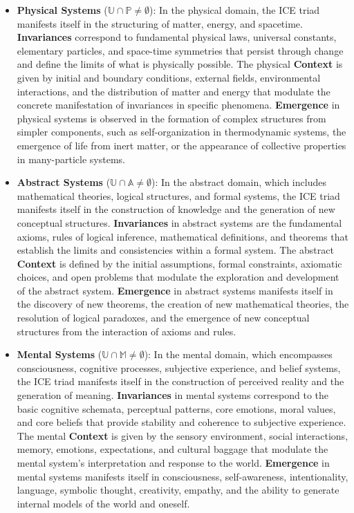 \documentclass{article}
\begin{document}
\begin{itemize}
\item \textbf{Physical Systems} ($\mathbb{U} \cap \mathbb{P} \neq \emptyset$): In the physical domain, the ICE triad manifests itself in the structuring of matter, energy, and spacetime. \textbf{Invariances} correspond to fundamental physical laws, universal constants, elementary particles, and space-time symmetries that persist through change and define the limits of what is physically possible. The physical \textbf{Context} is given by initial and boundary conditions, external fields, environmental interactions, and the distribution of matter and energy that modulate the concrete manifestation of invariances in specific phenomena. \textbf{Emergence} in physical systems is observed in the formation of complex structures from simpler components, such as self-organization in thermodynamic systems, the emergence of life from inert matter, or the appearance of collective properties in many-particle systems.

   \item \textbf{Abstract Systems} ($\mathbb{U} \cap \mathbb{A} \neq \emptyset$): In the abstract domain, which includes mathematical theories, logical structures, and formal systems, the ICE triad manifests itself in the construction of knowledge and the generation of new conceptual structures. \textbf{Invariances} in abstract systems are the fundamental axioms, rules of logical inference, mathematical definitions, and theorems that establish the limits and consistencies within a formal system. The abstract \textbf{Context} is defined by the initial assumptions, formal constraints, axiomatic choices, and open problems that modulate the exploration and development of the abstract system. \textbf{Emergence} in abstract systems manifests itself in the discovery of new theorems, the creation of new mathematical theories, the resolution of logical paradoxes, and the emergence of new conceptual structures from the interaction of axioms and rules.

\item \textbf{Mental Systems} ($\mathbb{U} \cap \mathbb{M} \neq \emptyset$): In the mental domain, which encompasses consciousness, cognitive processes, subjective experience, and belief systems, the ICE triad manifests itself in the construction of perceived reality and the generation of meaning. \textbf{Invariances} in mental systems correspond to the basic cognitive schemata, perceptual patterns, core emotions, moral values, and core beliefs that provide stability and coherence to subjective experience. The mental \textbf{Context} is given by the sensory environment, social interactions, memory, emotions, expectations, and cultural baggage that modulate the mental system's interpretation and response to the world. \textbf{Emergence} in mental systems manifests itself in consciousness, self-awareness, intentionality, language, symbolic thought, creativity, empathy, and the ability to generate internal models of the world and oneself.

\end{itemize}
\end{document}
